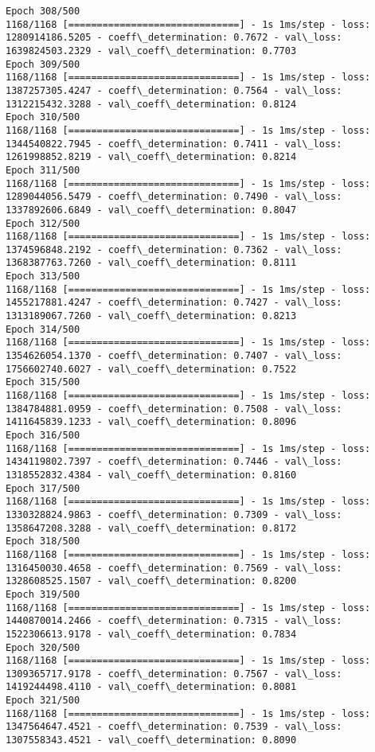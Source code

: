 \documentclass[11pt]{article}
\begin{document}
\begin{Verbatim}[commandchars=\\\{\}]
Epoch 308/500
1168/1168 [==============================] - 1s 1ms/step - loss: 1280914186.5205 - coeff\_determination: 0.7672 - val\_loss: 1639824503.2329 - val\_coeff\_determination: 0.7703
Epoch 309/500
1168/1168 [==============================] - 1s 1ms/step - loss: 1387257305.4247 - coeff\_determination: 0.7564 - val\_loss: 1312215432.3288 - val\_coeff\_determination: 0.8124
Epoch 310/500
1168/1168 [==============================] - 1s 1ms/step - loss: 1344540822.7945 - coeff\_determination: 0.7411 - val\_loss: 1261998852.8219 - val\_coeff\_determination: 0.8214
Epoch 311/500
1168/1168 [==============================] - 1s 1ms/step - loss: 1289044056.5479 - coeff\_determination: 0.7490 - val\_loss: 1337892606.6849 - val\_coeff\_determination: 0.8047
Epoch 312/500
1168/1168 [==============================] - 1s 1ms/step - loss: 1374596848.2192 - coeff\_determination: 0.7362 - val\_loss: 1368387763.7260 - val\_coeff\_determination: 0.8111
Epoch 313/500
1168/1168 [==============================] - 1s 1ms/step - loss: 1455217881.4247 - coeff\_determination: 0.7427 - val\_loss: 1313189067.7260 - val\_coeff\_determination: 0.8213
Epoch 314/500
1168/1168 [==============================] - 1s 1ms/step - loss: 1354626054.1370 - coeff\_determination: 0.7407 - val\_loss: 1756602740.6027 - val\_coeff\_determination: 0.7522
Epoch 315/500
1168/1168 [==============================] - 1s 1ms/step - loss: 1384784881.0959 - coeff\_determination: 0.7508 - val\_loss: 1411645839.1233 - val\_coeff\_determination: 0.8096
Epoch 316/500
1168/1168 [==============================] - 1s 1ms/step - loss: 1434119802.7397 - coeff\_determination: 0.7446 - val\_loss: 1318552832.4384 - val\_coeff\_determination: 0.8160
Epoch 317/500
1168/1168 [==============================] - 1s 1ms/step - loss: 1330328824.9863 - coeff\_determination: 0.7309 - val\_loss: 1358647208.3288 - val\_coeff\_determination: 0.8172
Epoch 318/500
1168/1168 [==============================] - 1s 1ms/step - loss: 1316450030.4658 - coeff\_determination: 0.7569 - val\_loss: 1328608525.1507 - val\_coeff\_determination: 0.8200
Epoch 319/500
1168/1168 [==============================] - 1s 1ms/step - loss: 1440870014.2466 - coeff\_determination: 0.7315 - val\_loss: 1522306613.9178 - val\_coeff\_determination: 0.7834
Epoch 320/500
1168/1168 [==============================] - 1s 1ms/step - loss: 1309365717.9178 - coeff\_determination: 0.7567 - val\_loss: 1419244498.4110 - val\_coeff\_determination: 0.8081
Epoch 321/500
1168/1168 [==============================] - 1s 1ms/step - loss: 1347564647.4521 - coeff\_determination: 0.7539 - val\_loss: 1307558343.4521 - val\_coeff\_determination: 0.8090

\end{Verbatim}
\end{document}
